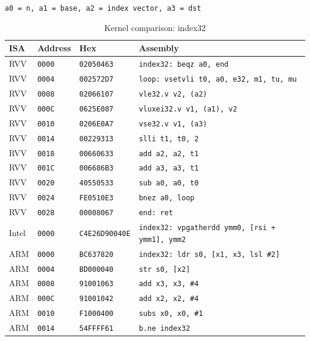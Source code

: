 \begin{table}[htbp]
\centering
\caption{Kernel comparison: index32}
\begingroup
\scriptsize
\setlength{\tabcolsep}{4pt}
\noindent \texttt{a0 = n, a1 = base, a2 = index vector, a3 = dst}\par
\vspace{0.6ex}
\begin{tabular}{@{}l|l|l|p{7.2cm}@{}}
\toprule
ISA & Address & Hex & Assembly \\
\midrule
RVV & \texttt{0000} & \texttt{02050463} & \texttt{index32: beqz a0, end} \\
RVV & \texttt{0004} & \texttt{002572D7} & \texttt{loop: vsetvli t0, a0, e32, m1, tu, mu} \\
RVV & \texttt{0008} & \texttt{02066107} & \texttt{vle32.v v2, (a2)} \\
RVV & \texttt{000C} & \texttt{0625E087} & \texttt{vluxei32.v v1, (a1), v2} \\
RVV & \texttt{0010} & \texttt{0206E0A7} & \texttt{vse32.v v1, (a3)} \\
RVV & \texttt{0014} & \texttt{00229313} & \texttt{slli t1, t0, 2} \\
RVV & \texttt{0018} & \texttt{00660633} & \texttt{add a2, a2, t1} \\
RVV & \texttt{001C} & \texttt{006686B3} & \texttt{add a3, a3, t1} \\
RVV & \texttt{0020} & \texttt{40550533} & \texttt{sub a0, a0, t0} \\
RVV & \texttt{0024} & \texttt{FE0510E3} & \texttt{bnez a0, loop} \\
RVV & \texttt{0028} & \texttt{00008067} & \texttt{end: ret} \\
\midrule
Intel & \texttt{0000} & \texttt{C4E26D90040E} & \texttt{index32: vpgatherdd ymm0, [rsi + ymm1], ymm2} \\
\midrule
ARM & \texttt{0000} & \texttt{BC637820} & \texttt{index32: ldr s0, [x1, x3, lsl \#2]} \\
ARM & \texttt{0004} & \texttt{BD000040} & \texttt{str s0, [x2]} \\
ARM & \texttt{0008} & \texttt{91001063} & \texttt{add x3, x3, \#4} \\
ARM & \texttt{000C} & \texttt{91001042} & \texttt{add x2, x2, \#4} \\
ARM & \texttt{0010} & \texttt{F1000400} & \texttt{subs x0, x0, \#1} \\
ARM & \texttt{0014} & \texttt{54FFFF61} & \texttt{b.ne index32} \\
\bottomrule
\end{tabular}
\endgroup
\end{table}
\noindent{}\par
